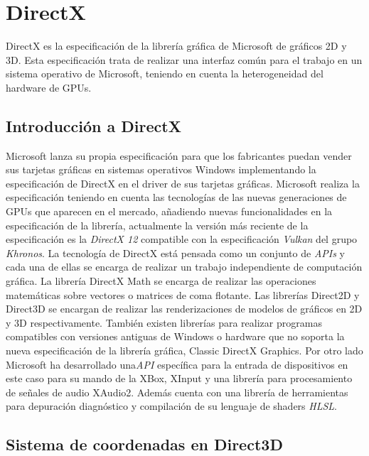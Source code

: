\documentclass[a4paper]{book}
\begin{document}
\section{DirectX}
\label{sec:DirectX}

DirectX es la especificación de la librería gráfica de Microsoft de gráficos 2D y 3D. Esta especificación trata de realizar
una interfaz común para el trabajo en un sistema operativo de Microsoft, teniendo en cuenta la heterogeneidad del hardware de GPUs.

\subsection{Introducción a DirectX}
\label{subsec:IntroDirectX}

Microsoft lanza su propia especificación para que los fabricantes puedan vender sus tarjetas gráficas en sistemas operativos Windows
implementando la especificación de DirectX en el driver de sus tarjetas gráficas. Microsoft realiza la especificación teniendo en
cuenta las tecnologías de las nuevas generaciones de GPUs que aparecen en el mercado, añadiendo nuevas funcionalidades en la
especificación de la librería, actualmente la versión más reciente de la especificación es la \textit{DirectX 12} compatible con la
especificación \textit{Vulkan} del grupo \textit{Khronos}. La tecnología de DirectX está pensada como un conjunto de \textit{APIs} y cada
una de ellas se encarga de realizar un trabajo independiente de computación gráfica. La librería DirectX Math se encarga de realizar las
operaciones matemáticas sobre vectores o matrices de coma flotante. Las librerías Direct2D y Direct3D se encargan de realizar las renderizaciones
de modelos de gráficos en 2D y 3D respectivamente. También existen librerías para realizar programas compatibles con
versiones antiguas de Windows o hardware que no soporta la nueva especificación de la librería gráfica, Classic DirectX
Graphics. Por otro lado Microsoft ha desarrollado una\textit{API} específica para la entrada de dispositivos en este caso para su
mando de la XBox, XInput y una librería para procesamiento de señales de audio XAudio2. Además cuenta con una librería
de herramientas para depuración diagnóstico y compilación de su lenguaje de shaders \textit{HLSL}. \cite{directx:_functionalities}

\subsection{Sistema de coordenadas en Direct3D}
\label{subsec:SysDirectX}
\end{document}
